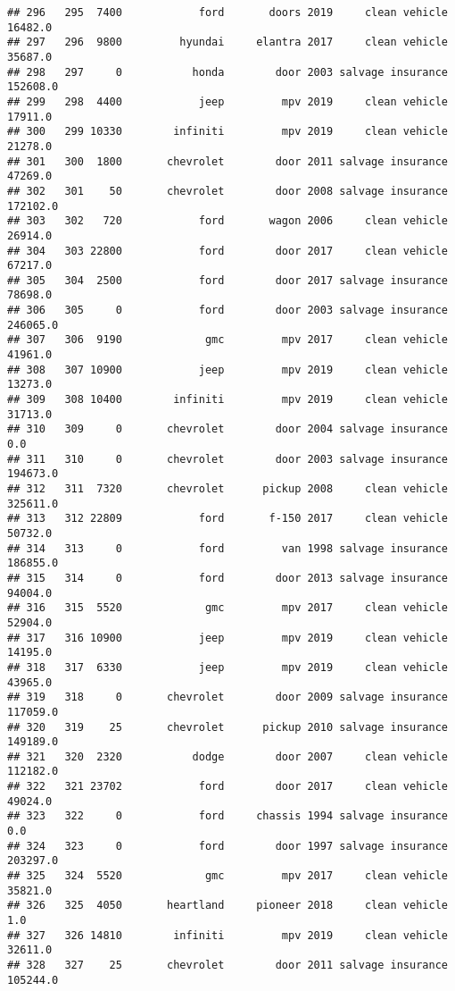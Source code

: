\documentclass[
]{article}
\begin{document}
\begin{verbatim}
## 296   295  7400            ford       doors 2019     clean vehicle   16482.0
## 297   296  9800         hyundai     elantra 2017     clean vehicle   35687.0
## 298   297     0           honda        door 2003 salvage insurance  152608.0
## 299   298  4400            jeep         mpv 2019     clean vehicle   17911.0
## 300   299 10330        infiniti         mpv 2019     clean vehicle   21278.0
## 301   300  1800       chevrolet        door 2011 salvage insurance   47269.0
## 302   301    50       chevrolet        door 2008 salvage insurance  172102.0
## 303   302   720            ford       wagon 2006     clean vehicle   26914.0
## 304   303 22800            ford        door 2017     clean vehicle   67217.0
## 305   304  2500            ford        door 2017 salvage insurance   78698.0
## 306   305     0            ford        door 2003 salvage insurance  246065.0
## 307   306  9190             gmc         mpv 2017     clean vehicle   41961.0
## 308   307 10900            jeep         mpv 2019     clean vehicle   13273.0
## 309   308 10400        infiniti         mpv 2019     clean vehicle   31713.0
## 310   309     0       chevrolet        door 2004 salvage insurance       0.0
## 311   310     0       chevrolet        door 2003 salvage insurance  194673.0
## 312   311  7320       chevrolet      pickup 2008     clean vehicle  325611.0
## 313   312 22809            ford       f-150 2017     clean vehicle   50732.0
## 314   313     0            ford         van 1998 salvage insurance  186855.0
## 315   314     0            ford        door 2013 salvage insurance   94004.0
## 316   315  5520             gmc         mpv 2017     clean vehicle   52904.0
## 317   316 10900            jeep         mpv 2019     clean vehicle   14195.0
## 318   317  6330            jeep         mpv 2019     clean vehicle   43965.0
## 319   318     0       chevrolet        door 2009 salvage insurance  117059.0
## 320   319    25       chevrolet      pickup 2010 salvage insurance  149189.0
## 321   320  2320           dodge        door 2007     clean vehicle  112182.0
## 322   321 23702            ford        door 2017     clean vehicle   49024.0
## 323   322     0            ford     chassis 1994 salvage insurance       0.0
## 324   323     0            ford        door 1997 salvage insurance  203297.0
## 325   324  5520             gmc         mpv 2017     clean vehicle   35821.0
## 326   325  4050       heartland     pioneer 2018     clean vehicle       1.0
## 327   326 14810        infiniti         mpv 2019     clean vehicle   32611.0
## 328   327    25       chevrolet        door 2011 salvage insurance  105244.0

\end{verbatim}
\end{document}
